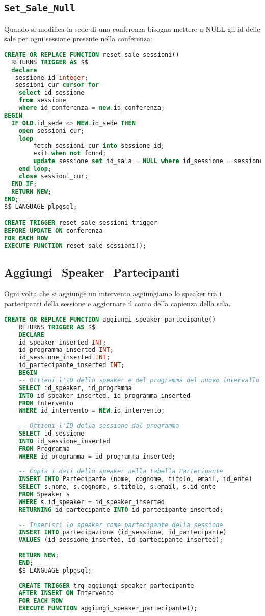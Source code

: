 \subsection{\texttt{Set\_Sale\_Null}}\label{trigger:setsalenull}
Quando si modifica la sede di una conferenza bisogna mettere a \textsc{NULL} gli id delle sale per ogni sessione presente nella conferenza:
\begin{lstlisting}[language=SQL,style=mystyle,caption={\texttt{Set\_Sale\_Null}}]
CREATE OR REPLACE FUNCTION reset_sale_sessioni()
  RETURNS TRIGGER AS $$
  declare
   sessione_id integer;
   sessioni_cur cursor for
    select id_sessione
    from sessione
    where id_conferenza = new.id_conferenza;
BEGIN
  IF OLD.id_sede <> NEW.id_sede THEN
    open sessioni_cur;
    loop
        fetch sessioni_cur into sessione_id;
        exit when not found;
        update sessione set id_sala = NULL where id_sessione = sessione_id;
    end loop;
    close sessioni_cur;
  END IF;
  RETURN NEW;
END;
$$ LANGUAGE plpgsql;

CREATE TRIGGER reset_sale_sessioni_trigger
BEFORE UPDATE ON conferenza
FOR EACH ROW
EXECUTE FUNCTION reset_sale_sessioni();
\end{lstlisting}
\subsection{Aggiungi\_Speaker\_Partecipanti}
Ogni volta che si aggiunge un intervento aggiungiamo lo speaker tra i partecipanti della sessione e aggiornare il conto della capienza della sala.
\begin{lstlisting}[language=SQL,style=mystyle,caption={\texttt{Aggiungi\_Speaker\_Partecipanti}}]
	CREATE OR REPLACE FUNCTION aggiungi_speaker_partecipante()
	RETURNS TRIGGER AS $$
	DECLARE
	id_speaker_inserted INT;
	id_programma_inserted INT;
	id_sessione_inserted INT;
	id_partecipante_inserted INT;
	BEGIN
	-- Ottieni l'ID dello speaker e del programma del nuovo intervallo
	SELECT id_speaker, id_programma
	INTO id_speaker_inserted, id_programma_inserted
	FROM Intervento
	WHERE id_intervento = NEW.id_intervento;
	
	-- Ottieni l'ID della sessione dal programma
	SELECT id_sessione
	INTO id_sessione_inserted
	FROM Programma
	WHERE id_programma = id_programma_inserted;
	
	-- Copia i dati dello speaker nella tabella Partecipante
	INSERT INTO Partecipante (nome, cognome, titolo, email, id_ente)
	SELECT s.nome, s.cognome, s.titolo, s.email, s.id_ente
	FROM Speaker s
	WHERE s.id_speaker = id_speaker_inserted
	RETURNING id_partecipante INTO id_partecipante_inserted;
	
	-- Inserisci lo speaker come partecipante della sessione
	INSERT INTO partecipazione (id_sessione, id_partecipante)
	VALUES (id_sessione_inserted, id_partecipante_inserted);
	
	RETURN NEW;
	END;
	$$ LANGUAGE plpgsql;
	
	CREATE TRIGGER trg_aggiungi_speaker_partecipante
	AFTER INSERT ON Intervento
	FOR EACH ROW
	EXECUTE FUNCTION aggiungi_speaker_partecipante();
\end{lstlisting}
